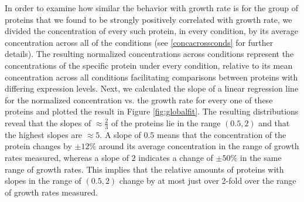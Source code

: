 In order to examine how similar the behavior with growth rate is for the group of proteins that we found to be strongly positively correlated with growth rate, we divided the concentration of every such protein, in every condition, by its average concentration across all of the conditions (see \ref{concacrossconds} for further details).
The resulting normalized concentrations across conditions represent the concentrations of the specific protein under every condition, relative to its mean concentration across all conditions facilitating comparisons between proteins with differing expression levels.
Next, we calculated the slope of a linear regression line for the normalized concentration vs. the growth rate for every one of these proteins and plotted the result in Figure \ref{fig:globalfit}.
The resulting distributions reveal that the slopes of $\approx \frac{2}{3}$ of the proteins lie in the range $(0.5,2)$ and that the highest slopes are $\approx 5$.
A slope of $0.5$ means that the concentration of the protein changes by $\pm12\%$ around its average concentration in the range of growth rates measured, whereas a slope of $2$ indicates a change of $\pm50\%$ in the same range of growth rates.
This implies that the relative amounts of proteins with slopes in the range of $(0.5,2)$ change by at most just over 2-fold over the range of growth rates measured.